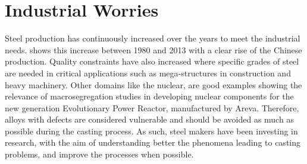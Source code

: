 %
%

\section{Industrial Worries}

Steel production has continuously increased over the years to meet the industrial needs. 
 shows this increase between 1980 and 2013 with a 
clear rise of the Chinese production. Quality constraints have also increased where specific 
grades of steel are needed in critical applications such as mega-structures
in construction and  heavy machinery. Other domains like the nuclear, are good examples showing the relevance of macrosegregation
studies in developing nuclear components for the new generation Evolutionary Power Reactor, manufactured by Areva. Therefore, alloys with defects are considered vulnerable 
and should be avoided as much as possible during the casting process. As such, steel makers have been investing
in research, with the aim of understanding better the phenomena leading to casting problems, 
and improve the processes when possible.

